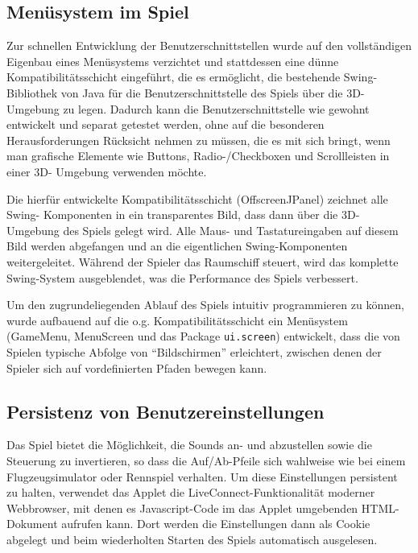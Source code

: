 \documentclass[a4paper,12pt]{scrartcl}
\begin{document}
\subsection{Menüsystem im Spiel}
Zur schnellen Entwicklung der Benutzerschnittstellen wurde auf den
vollständigen Eigenbau eines Menüsystems verzichtet und stattdessen eine dünne Kompatibilitätsschicht
eingeführt, die es ermöglicht, die bestehende Swing-Bibliothek von Java für die
Benutzerschnittstelle des Spiels über die 3D-Umgebung zu legen. Dadurch kann die
Benutzerschnittstelle wie gewohnt entwickelt und separat getestet werden, ohne auf die
besonderen Herausforderungen Rücksicht nehmen zu müssen, die es mit sich bringt, wenn
man grafische Elemente wie Buttons, Radio-/Checkboxen und Scrollleisten in einer 3D-
Umgebung verwenden möchte.

Die hierfür entwickelte Kompatibilitätsschicht (OffscreenJPanel) zeichnet alle Swing-
Komponenten in ein transparentes Bild, dass dann über die 3D-Umgebung des Spiels
gelegt wird. Alle Maus- und Tastatureingaben auf diesem Bild werden abgefangen und an
die eigentlichen Swing-Komponenten weitergeleitet. Während der Spieler das Raumschiff
steuert, wird das komplette Swing-System ausgeblendet, was die Performance des Spiels
verbessert.

Um den zugrundeliegenden Ablauf des Spiels intuitiv programmieren zu können, wurde
aufbauend auf die o.g. Kompatibilitätsschicht ein Menüsystem (GameMenu, MenuScreen
und das Package \texttt{ui.screen}) entwickelt, dass die von Spielen typische
Abfolge von "`Bildschirmen"' erleichtert, zwischen denen der Spieler sich auf vordefinierten Pfaden
bewegen kann.

\subsection{Persistenz von Benutzereinstellungen}
Das Spiel bietet die Möglichkeit, die Sounds an- und abzustellen sowie die Steuerung zu
invertieren, so dass die Auf/Ab-Pfeile sich wahlweise wie bei einem Flugzeugsimulator oder
Rennspiel verhalten. Um diese Einstellungen persistent zu halten, verwendet das Applet die
LiveConnect-Funktionalität moderner Webbrowser, mit denen es Javascript-Code im das
Applet umgebenden HTML-Dokument aufrufen kann. Dort werden die Einstellungen dann
als Cookie abgelegt und beim wiederholten Starten des Spiels automatisch ausgelesen.
\end{document}
